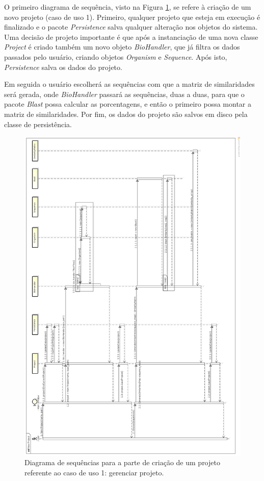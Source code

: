 O primeiro diagrama de sequência, visto na Figura \ref{fig:new-project}, se refere à criação de um novo projeto (caso de uso 1). Primeiro, qualquer projeto
que esteja em execução é finalizado e o pacote \textit{Persistence} salva qualquer alteração nos objetos do sistema. Uma decisão de projeto importante
é que após a instanciação de uma nova classe \textit{Project} é criado também um novo objeto \textit{BioHandler}, que já filtra os dados passados pelo
usuário, criando objetos \textit{Organism} e \textit{Sequence}. Após isto, \textit{Persistence} salva os dados do projeto.

Em seguida o usuário escolherá as sequências com que a matriz de similaridades será gerada, onde \textit{BioHandler} passará as sequências, duas a duas,
para que o pacote \textit{Blast} possa calcular as porcentagens, e então o primeiro possa montar a matriz de similaridades. Por fim, os dados do projeto
são salvos em disco pela classe de persistência.

\begin{figure}
\centering
\includegraphics[scale=0.27]{new-project}
\caption{Diagrama de sequências para a parte de criação de um projeto referente ao caso de uso 1: gerenciar projeto.}
\label{fig:new-project}
\end{figure}

